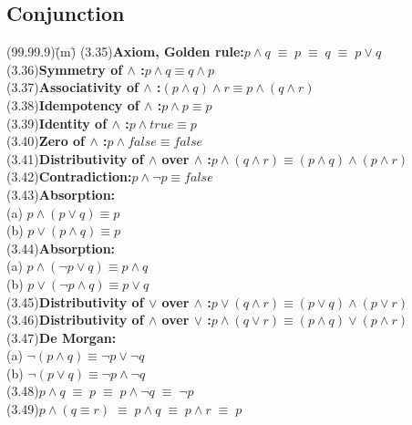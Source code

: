 \documentclass{amsart}
\newcommand{\lgap}{2pt}                             %
\newcommand{\equivs}{\ensuremath{\;\equiv\;}}       %
\begin{document}
\subsection*{Conjunction}
\begin{tabbing}
(99.99.9)\;\=(m)\;\=\kill
(3.35)\>\textbf{Axiom, Golden rule:}\quad $p\land q\equivs p\equivs q\equivs p\lor q$\\[\lgap]
(3.36)\>\textbf{Symmetry of $\land$ :}\quad $p\land q \equiv q\land p$\\[\lgap]
(3.37)\>\textbf{Associativity of $\land$ :}\quad $(p\land q) \land r\equiv p\land (q\land r)$\\[\lgap]
(3.38)\>\textbf{Idempotency of $\land$ :}\quad  $p\land p \equiv p$\\[\lgap]
(3.39)\>\textbf{Identity of $\land$ :}\quad $p\land true\equiv p$\\[\lgap]
(3.40)\>\textbf{Zero of $\land$ :}\quad $p\land false\equiv false$\\[\lgap]
(3.41)\>\textbf{Distributivity of $\land$ over $\land$ :}\quad $p\land (q\land r)\equiv (p\land q)\land (p\land r)$\\[\lgap]
(3.42)\>\textbf{Contradiction:}\quad $p \land \neg p \equiv false$\\[\lgap]
(3.43)\>\textbf{Absorption:}\\
      \> (a)\> $p \land (p \lor q) \equiv p$\\[\lgap]
      \> (b)\> $p \lor (p \land q) \equiv p$\\[\lgap]
(3.44)\>\textbf{Absorption:}\\
      \> (a)\> $p \land (\neg p \lor q) \equiv p \land q$\\[\lgap]
      \> (b)\> $p \lor (\neg p \land q) \equiv p \lor q$\\[\lgap]
(3.45)\>\textbf{Distributivity of $\lor$ over $\land$ :}\quad $p\lor (q\land r)\equiv (p\lor q)\land (p\lor r)$\\[\lgap]
(3.46)\>\textbf{Distributivity of $\land$ over $\lor$ :}\quad $p\land (q\lor r)\equiv (p\land q)\lor (p\land r)$\\[\lgap]
(3.47)\>\textbf{De Morgan:}\\
      \> (a)\> $\neg (p \land q) \equiv \neg p \lor \neg q$\\[\lgap]
      \> (b)\> $\neg (p \lor q) \equiv \neg p \land \neg q$\\[\lgap]
(3.48)\>$p\land q\equivs p\equivs p\land \neg q\equivs \neg p$\\[\lgap]
(3.49)\>$p\land (q\equiv r)\equivs p\land q\equivs p\land r \equivs p$\\[\lgap]

\end{tabbing}
\end{document}
